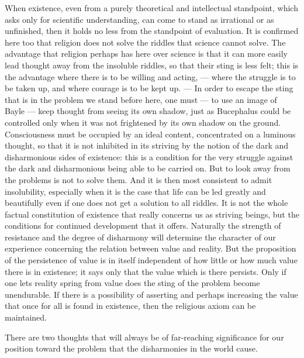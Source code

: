 \documentclass[12pt,a4paper,openany]{book}
\newcommand{\opage}[1]{\marginnote{\footnotesize\textit{[#1]}}}
\begin{document}
When existence, even from a purely theoretical and intellectual standpoint, which asks
only for scientific understanding, can come to stand as irrational or as unfinished,
then it holds no less from the standpoint of evaluation. It is confirmed here too that
religion does not solve the riddles that science cannot solve. The advantage that
religion perhaps has here over science is that it can more easily lead thought away from
the insoluble riddles, so that their sting is less felt; this is the advantage where there
is to be willing and acting, --- where the struggle is to be taken up, and where courage
is to be kept up. --- In order to escape the sting that is in the problem we stand before
here, one must --- to use an image of Bayle --- keep thought from seeing its own shadow,
just as Bucephalus could be controlled only when it was not frightened by its own shadow
on the ground. Consciousness must be occupied by an ideal content, concentrated on a
luminous thought, so that it is not inhibited in its striving by the notion
\setcounter{footnote}{0}%
\opage{246}of the dark and disharmonious sides of existence: this is a condition for the very
struggle against the dark and disharmonious being able to be carried on. But to look away
from the problems is not to solve them. And it is then most consistent to admit
insolubility, especially when it is the case that life can be led greatly and beautifully
even if one does not get a solution to all riddles. It is not the whole factual
constitution of existence that really concerns us as striving beings, but the conditions
for continued development that it offers. Naturally the strength of resistance and the
degree of disharmony will determine the character of our experience concerning the
relation between value and reality. But the proposition of the persistence of value is in
itself independent of how little or how much value there is in existence; it says only
that the value which is there persists. Only if one lets reality spring from value does
the sting of the problem become unendurable. If there is a possibility of asserting and
perhaps increasing the value that once for all is found in existence, then the religious
axiom can be maintained.

There are two thoughts that will always be of far-reaching significance for our position
toward the problem that the disharmonies in the world cause.
\end{document}
